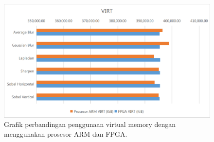 \begin{figure}[H]
    \includegraphics[width=0.81\linewidth, center]{images/chart/chart-virt.png}
    \caption{Grafik perbandingan penggunaan virtual memory dengan menggunakan prosesor ARM dan FPGA.}
    \label{fig:chart-virt}
\end{figure}